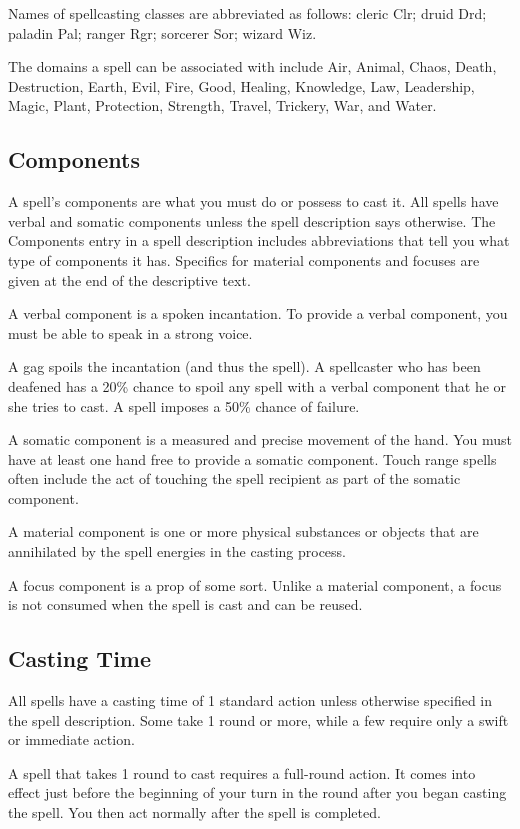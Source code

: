 Names of spellcasting classes are abbreviated as follows: cleric Clr; druid Drd; paladin Pal; ranger Rgr; sorcerer Sor; wizard Wiz.

The domains a spell can be associated with include Air, Animal, Chaos, Death, Destruction, Earth, Evil, Fire, Good, Healing, Knowledge, Law, Leadership, Magic, Plant, Protection, Strength, Travel, Trickery, War, and Water.

\subsection{Components}
A spell's components are what you must do or possess to cast it. All spells have verbal and somatic components unless the spell description says otherwise. The Components entry in a spell description includes abbreviations that tell you what type of components it has. Specifics for material components and focuses are given at the end of the descriptive text.

 A verbal component is a spoken incantation. To provide a verbal component, you must be able to speak in a strong voice.

A gag spoils the incantation (and thus the spell). A spellcaster who has been deafened has a 20\% chance to spoil any spell with a verbal component that he or she tries to cast. A  spell imposes a 50\% chance of failure.

 A somatic component is a measured and precise movement of the hand. You must have at least one hand free to provide a somatic component. Touch range spells often include the act of touching the spell recipient as part of the somatic component.

 A material component is one or more physical substances or objects that are annihilated by the spell energies in the casting process.

 A focus component is a prop of some sort. Unlike a material component, a focus is not consumed when the spell is cast and can be reused.

\subsection{Casting Time}
All spells have a casting time of 1 standard action unless otherwise specified in the spell description. Some take 1 round or more, while a few require only a swift or immediate action.

A spell that takes 1 round to cast requires a full-round action. It comes into effect just before the beginning of your turn in the round after you began casting the spell. You then act normally after the spell is completed.

